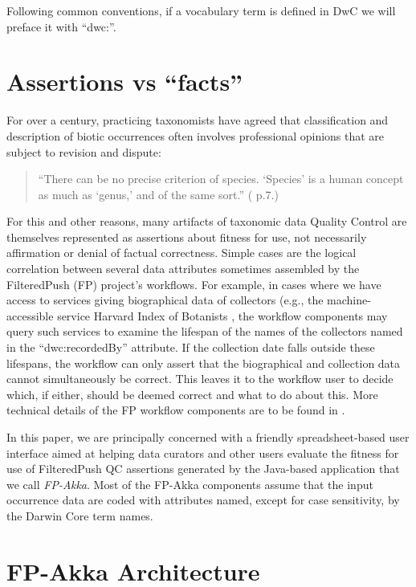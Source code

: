 \documentclass{article}
\begin{document}
Following common conventions, if a vocabulary term is defined in DwC we will preface it with “dwc:”. 
\section{Assertions vs “facts”}
For over a century, practicing taxonomists have agreed that classification and description of biotic occurrences often involves professional opinions that are subject to revision and dispute:
\begin{quotation}
``There can be no precise criterion of species. `Species' is a human concept as much as `genus,' and of the same sort.'' (\citep{lutz_variation_1908} p.7.)
\end{quotation}

For this and other reasons, many artifacts of taxonomic data Quality Control are themselves represented as assertions about fitness for use, not necessarily affirmation or denial of factual correctness. Simple cases are the logical correlation between several data attributes sometimes assembled by the FilteredPush (FP) \citep{filteredpushWeb_2016} project's workflows. For example, in cases where we have access to services giving biographical data of collectors (e.g., the machine-accessible service Harvard Index of Botanists \citep{harvard_university_herbaria_&_libraries_index_2013}, the workflow components may query such services to examine the lifespan of the names of the collectors named in the “dwc:recordedBy” attribute. If the collection date falls outside these lifespans, the workflow can only assert that the biographical and collection data cannot simultaneously be correct. This leaves it to the workflow user to decide which, if either, should be deemed correct and what to do about this. More technical details of the FP workflow components are to be found in \citep{song_towards_2014}.  

In this paper, we are principally concerned with a friendly spreadsheet-based user interface aimed at helping data curators and other users evaluate the fitness for use of FilteredPush QC assertions generated by the Java-based application that we call \emph{FP-Akka}. 
Most of the FP-Akka components assume that the input occurrence data are coded with attributes named, except for case sensitivity,  by the Darwin Core term names.



\section{FP-Akka Architecture}
\end{document}
